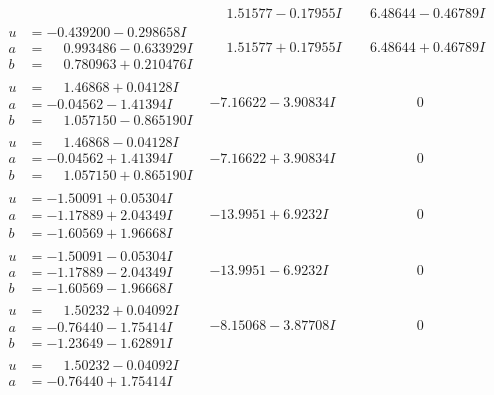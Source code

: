 \documentclass[1p]{elsarticle_modified}
\theoremstyle{definition}
\begin{document}
$$\begin{array}{c|c|c}
 & \phantom{-}1.51577 - 0.17955 I & \phantom{-}6.48644 - 0.46789 I \\ \hline\begin{aligned}
u &= -0.439200 - 0.298658 I \\
a &= \phantom{-}0.993486 - 0.633929 I \\
b &= \phantom{-}0.780963 + 0.210476 I\end{aligned}
 & \phantom{-}1.51577 + 0.17955 I & \phantom{-}6.48644 + 0.46789 I \\ \hline\begin{aligned}
u &= \phantom{-}1.46868 + 0.04128 I \\
a &= -0.04562 - 1.41394 I \\
b &= \phantom{-}1.057150 - 0.865190 I\end{aligned}
 & -7.16622 - 3.90834 I & \phantom{-0.000000 } 0 \\ \hline\begin{aligned}
u &= \phantom{-}1.46868 - 0.04128 I \\
a &= -0.04562 + 1.41394 I \\
b &= \phantom{-}1.057150 + 0.865190 I\end{aligned}
 & -7.16622 + 3.90834 I & \phantom{-0.000000 } 0 \\ \hline\begin{aligned}
u &= -1.50091 + 0.05304 I \\
a &= -1.17889 + 2.04349 I \\
b &= -1.60569 + 1.96668 I\end{aligned}
 & -13.9951 + 6.9232 I & \phantom{-0.000000 } 0 \\ \hline\begin{aligned}
u &= -1.50091 - 0.05304 I \\
a &= -1.17889 - 2.04349 I \\
b &= -1.60569 - 1.96668 I\end{aligned}
 & -13.9951 - 6.9232 I & \phantom{-0.000000 } 0 \\ \hline\begin{aligned}
u &= \phantom{-}1.50232 + 0.04092 I \\
a &= -0.76440 - 1.75414 I \\
b &= -1.23649 - 1.62891 I\end{aligned}
 & -8.15068 - 3.87708 I & \phantom{-0.000000 } 0 \\ \hline\begin{aligned}
u &= \phantom{-}1.50232 - 0.04092 I \\
a &= -0.76440 + 1.75414 I \\

\end{aligned}
\end{array}$$
\end{document}
